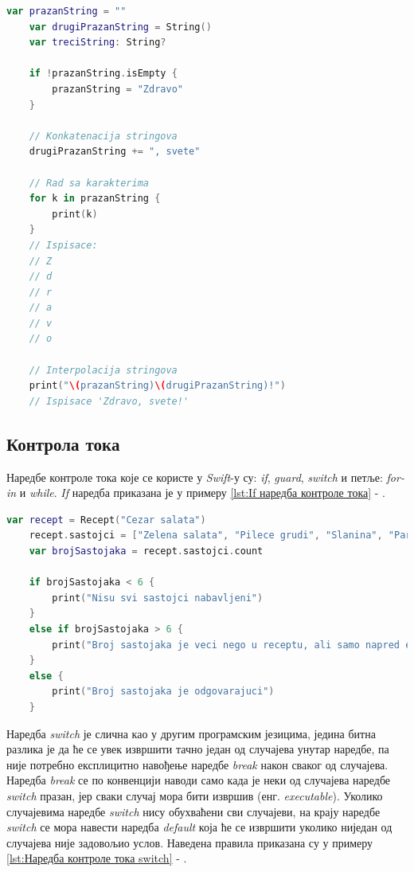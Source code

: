 \documentclass[12pt,oneside]{memoir}
\begin{document}
\begin{lstlisting}[caption=\textit{{Операције над стринговима}}, label={lst:Операције над стринговима}, language=Swift, frame=single]
    var prazanString = ""
    var drugiPrazanString = String()
    var treciString: String?
    
    if !prazanString.isEmpty {
        prazanString = "Zdravo"
    }
    
    // Konkatenacija stringova
    drugiPrazanString += ", svete"
    
    // Rad sa karakterima
    for k in prazanString {
        print(k)
    }
    // Ispisace: 
    // Z
    // d
    // r
    // a
    // v
    // o
    
    // Interpolacija stringova
    print("\(prazanString)\(drugiPrazanString)!")
    // Ispisace 'Zdravo, svete!'
\end{lstlisting}

\subsection{Контрола тока}
\label{subsec:Контрола тока}

\indent Наредбе контроле тока које се користе у \textit{Swift}-у су: \textit{if}, \textit{guard}, \textit{switch} и петље: \textit{for-in} и \textit{while}. \textit{If} наредба приказана је у примеру \ref{lst:If наредба контроле тока} - .

\begin{lstlisting}[caption=\textit{{If наредбa контроле тока}}, label={lst:If наредба контроле тока}, language=Swift, frame=single]
    var recept = Recept("Cezar salata")
    recept.sastojci = ["Zelena salata", "Pilece grudi", "Slanina", "Paradajz", "Hleb", "Cezar premaz"]
    var brojSastojaka = recept.sastojci.count
    
    if brojSastojaka < 6 {
        print("Nisu svi sastojci nabavljeni")
    }
    else if brojSastojaka > 6 {
        print("Broj sastojaka je veci nego u receptu, ali samo napred eksperimentisi")
    }
    else {
        print("Broj sastojaka je odgovarajuci")
    }
\end{lstlisting}

\indent Наредба \textit{switch} је слична као у другим програмским језицима, једина битна разлика је да ће се увек извршити тачно један од случајева унутар наредбе, па није потребно експлицитно навођење наредбе \textit{break} након сваког од случајева. Наредба \textit{break} се по конвенцији наводи само када је неки од случајева наредбе \textit{switch} празан, јер сваки случај мора бити извршив (енг. \textit{executable}). Уколико случајевима наредбе \textit{switch} нису обухваћени сви случајеви, на крају наредбе \textit{switch} се мора навести наредба \textit{default} која ће се извршити уколико ниједан од случајева није задовољио услов.  Наведена правила приказана су у примеру \ref{lst:Наредба контроле тока switch} - .
\end{document}
